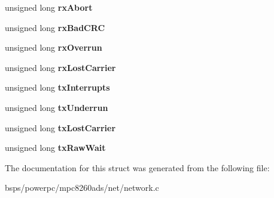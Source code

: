 \begin{DoxyCompactItemize}
unsigned long {\bfseries rx\+Abort}
\item 
\mbox{\label{structm8260__hdlc__struct_acddc5c621e5d0d967cb02cdadc66f7fd}} 
unsigned long {\bfseries rx\+Bad\+C\+RC}
\item 
\mbox{\label{structm8260__hdlc__struct_a346445a4af87ff6502ccd290dfe2e52e}} 
unsigned long {\bfseries rx\+Overrun}
\item 
\mbox{\label{structm8260__hdlc__struct_a2b4446e0271266d0449cc7f58f120c10}} 
unsigned long {\bfseries rx\+Lost\+Carrier}
\item 
\mbox{\label{structm8260__hdlc__struct_abf26bf3d1abc378cfa7f012903237fb3}} 
unsigned long {\bfseries tx\+Interrupts}
\item 
\mbox{\label{structm8260__hdlc__struct_ac08fa2c57a5b84831ffd96fcc53546b9}} 
unsigned long {\bfseries tx\+Underrun}
\item 
\mbox{\label{structm8260__hdlc__struct_aff163000ffea7b92c22161488f19a1e6}} 
unsigned long {\bfseries tx\+Lost\+Carrier}
\item 
\mbox{\label{structm8260__hdlc__struct_a0be15267e15dceb08e105271f4463bab}} 
unsigned long {\bfseries tx\+Raw\+Wait}
\end{DoxyCompactItemize}


The documentation for this struct was generated from the following file\+:\begin{DoxyCompactItemize}
\item 
bsps/powerpc/mpc8260ads/net/network.\+c\end{DoxyCompactItemize}
